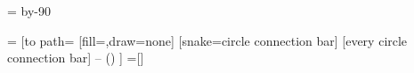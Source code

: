 {{{    \setlength\@tempdimb{\pgfsnakesegmentamplitude}%
    \pgfpathcurveto
    {\pgfpointadd
      {\pgfpointpolar{-\pgfsnakesegmentangle}{\pgfsnakecircleendradius}}
      {}}
    {}
    {}
    \@tempcnta=\pgfsnakesegmentangle\relax
    \advance\@tempcnta by-90\relax
    \pgfpathcurveto
    {}
    {\pgfpointadd
      {\pgfpointpolar{\pgfsnakesegmentangle}{\pgfsnakecircleendradius}}
      {}}
    {\pgfpointpolar{\pgfsnakesegmentangle}{\pgfsnakecircleendradius}}
    \pgfpathclose
    }
  }
  {}
}


\def\pgfsnakecirclestartradius{1cm}
\def\pgfsnakecircleendradius{1cm}
\def\pgfsnakesegmentangle{22}





=
[to path={
  \pgfextra{\tikz@compute@circle@radii\tikz@compute@segmentamplitude}
  [fill=\tikz@concept@color,draw=none]
  [snake=circle connection bar]
  [every circle connection bar]
  -- (\tikztotarget) \tikztonodes
}]
=[]

\def\tikz@compute@circle@radii{%
  \pgf@process{\pgfpointtransformed{\pgfpointanchor{\tikztostart}{center}}}%
  \pgf@xa=\pgf@x%
  \pgf@process{\pgfpointtransformed{\pgfpointanchor{\tikztostart}{west}}}%
  \advance\pgf@xa by-\pgf@x%
  \edef\pgfsnakecirclestartradius{\the\pgf@xa}%
  \pgf@process{\pgfpointtransformed{\pgfpointanchor{\tikztotarget}{center}}}%
  \pgf@xa=\pgf@x%
  \pgf@process{\pgfpointtransformed{\pgfpointanchor{\tikztotarget}{west}}}%
  \advance\pgf@xa by-\pgf@x%
  \edef\pgfsnakecircleendradius{\the\pgf@xa}%
}
\def\tikz@compute@segmentamplitude{%
  \pgf@x=\pgfsnakecirclestartradius\relax%
  \ifdim\pgf@x>\pgfsnakecircleendradius\relax%
    \pgf@x=\pgfsnakecircleendradius\relax%
  \fi%
  \pgf@x=.2\pgf@x\relax%
  \edef\pgfsnakesegmentamplitude{\the\pgf@x}%
}



\def\tikz@parse@switch from#1to#2\pgf@unique{%
  \def\tikz@to@path{%
    \pgfextra{%
      \colorlet{tikz@switch@from}{#1}%
      \colorlet{tikz@switch@to}{#2}%
      \tikz@compute@circle@radii\tikz@compute@segmentamplitude%
      \tikz@compute@rotation%
    }
    [fill=none,draw=none]
    [snake=circle connection bar]
    [every circle connection bar]
    -- (\tikztotarget) \tikztonodes
    [shading=tikz@shade@bar]
  }
}


